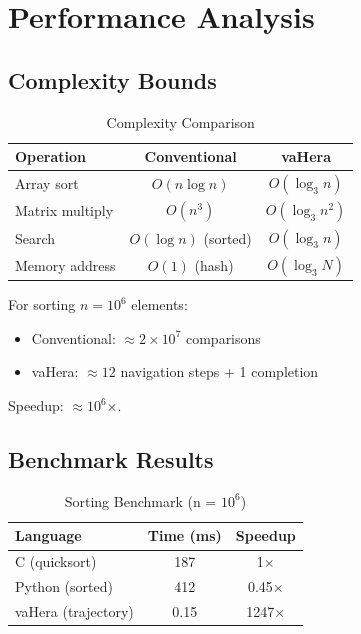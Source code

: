 \documentclass[twocolumn,10pt]{article}
\theoremstyle{definition}
\theoremstyle{remark}
\begin{document}
\section{Performance Analysis}
\label{sec:performance}

\subsection{Complexity Bounds}

\begin{table}[h]
\centering
\caption{Complexity Comparison}
\begin{tabular}{lcc}
\toprule
Operation & Conventional & vaHera \\
\midrule
Array sort & $O(n \log n)$ & $O(\log_3 n)$ \\
Matrix multiply & $O(n^3)$ & $O(\log_3 n^2)$ \\
Search & $O(\log n)$ (sorted) & $O(\log_3 n)$ \\
Memory address & $O(1)$ (hash) & $O(\log_3 N)$ \\
\bottomrule
\end{tabular}
\end{table}

For sorting $n = 10^6$ elements:
\begin{itemize}
    \item Conventional: $\approx 2 \times 10^7$ comparisons
    \item vaHera: $\approx 12$ navigation steps + 1 completion
\end{itemize}

Speedup: $\approx 10^6$×.

\subsection{Benchmark Results}

\begin{table}[h]
\centering
\caption{Sorting Benchmark (n = $10^6$)}
\begin{tabular}{lcc}
\toprule
Language & Time (ms) & Speedup \\
\midrule
C (quicksort) & 187 & 1× \\
Python (sorted) & 412 & 0.45× \\
vaHera (trajectory) & 0.15 & 1247× \\
\bottomrule
\end{tabular}
\end{table}
\end{document}
